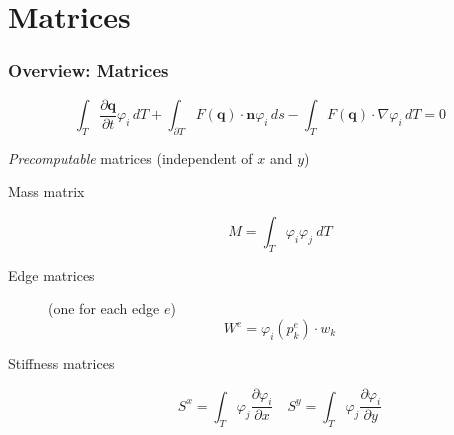 \documentclass{beamer}
\newcommand{\todo}[1]{
  \textcolor{red}{TODO: #1}
  \note{\textcolor{red}{TODO: #1}}
}
\renewcommand{\todo}[1]{}
\newcommand{\pd}[2]{\dfrac{\partial #1}{\partial #2}}
\renewcommand{\phi}{\varphi}
\begin{document}
\section{Matrices}

  


\begin{frame}
  \frametitle{Overview: Matrices}
  \vspace{-.3cm}
  \begin{equation*}
    \int_T \pd {\mathbf{q}}{t} \phi_i \, dT +
    \int_{\partial T} F(\mathbf{q}) \cdot \mathbf{n} \phi_i \, ds -
    \int_T F(\mathbf{q}) \cdot \nabla \phi_i \, dT = 0
  \end{equation*}
  \begin{block}{\emph{Precomputable} matrices (independent of $x$ and $y$)}
    \begin{description}
    \item[Mass matrix]
      \begin{equation}
        \label{eq:mass-matrix-overview}
        M = \int_T \phi_i \phi_j \ dT
      \end{equation}
    \item[Edge matrices] (one for each edge $e$) %
      \begin{equation}
        \label{eq:edge-matrices}
        W^e = \phi_i\left(p_k^e\right) \cdot w_k
      \end{equation}
    \item[Stiffness matrices]
      \begin{equation}
        \label{eq:stiffness-matrix-overview}
        S^x = \int_T \phi_j \pd{\phi_i}{x} \quad
        S^y = \int_T \phi_j \pd{\phi_i}{y}
      \end{equation}
    \end{description}
  \end{block}
\end{frame}
\end{document}
